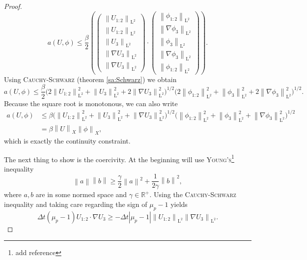 \documentclass[12pt,a4paper,twoside, open=right]{scrreprt}
\theoremstyle{definition}
\theoremstyle{plain}
\newcommand{\abs}[1]{\left\vert #1\right\vert}
\newcommand{\rr}{\mathbb{R}}
\newcommand{\norm}[1]{\left\lVert#1\right\rVert}
\newcommand{\ltnorm}[1]{\norm{#1}_{\mathrm{L}^2}}
\begin{document}
\begin{proof}
    \begin{equation}
        a(U,\phi)\le \frac{\beta}{2}\left(\begin{pmatrix}
        \ltnorm{U_{1:2}}\\\ltnorm{U_{1:2}}\\\ltnorm{U_{3}}\\\ltnorm{\nabla U_{3}}\\\ltnorm{\nabla U_{3}}
        \end{pmatrix}\cdot \begin{pmatrix}
        \ltnorm{\phi_{1:2}}\\\ltnorm{\nabla\phi_{3}}\\\ltnorm{\phi_{3}}\\\ltnorm{\nabla \phi_{3}}\\\ltnorm{\phi_{1:2}}
        \end{pmatrix}\right).
    \end{equation}
    Using \textsc{Cauchy-Schwarz} (theorem \ref{sa:Schwarz}) we obtain
    \begin{equation}
        a(U,\phi)\le\frac{\beta}{2}\bigg(2\ltnorm{U_{1:2}}^2+\ltnorm{U_3}^2+2\ltnorm{\nabla U_3}^2
        \bigg)^{1/2}\bigg(2\ltnorm{\phi_{1:2}}^2+\ltnorm{\phi_3}^2+2\ltnorm{\nabla \phi_3}^2\bigg)^{1/2}.
    \end{equation}
    Because the square root is monotonous, we can also write
    \begin{align}
        a(U,\phi)&\le\beta\bigg(\ltnorm{U_{1:2}}^2+\ltnorm{U_3}^2+\ltnorm{\nabla U_3}^2
        \bigg)^{1/2}\bigg(\ltnorm{\phi_{1:2}}^2+\ltnorm{\phi_3}^2+\ltnorm{\nabla \phi_3}^2\bigg)^{1/2}\\&=\beta\norm{U}_X\norm{\phi}_X,
    \end{align}
    which is exactly the continuity constraint. 
    \par The next thing to show is the coercivity. At the beginning will use \textsc{Young's}\footnote{add reference} inequality 
    \begin{equation}
        \norm{a}\norm{b}\ge\frac{\gamma}{2}\norm{a}^2+\frac{1}{2\gamma}\norm{b}^2,
    \end{equation} where $a,b$ are in some normed space and $\gamma\in\rr^+$.
    Using the \textsc{Cauchy-Schwarz} inequality and taking care regarding the sign of $\mu_p-1$ yields
    \begin{equation}
        \Delta t(\mu_p-1)U_{1:2}\cdot \nabla U_3\ge -\Delta t\abs{\mu_p -1}\ltnorm{U_{1:2}}\ltnorm{\nabla U_3}.
    \end{equation}

\end{proof}
\end{document}
